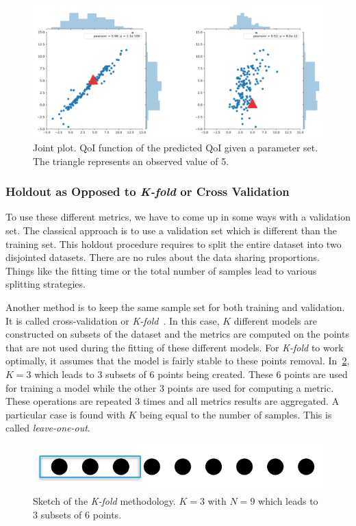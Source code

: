 \begin{figure}[!ht]
\centering
\includegraphics[width=\linewidth,keepaspectratio]{fig/literature/qq_plot.png}
\caption{Joint plot. QoI function of the predicted QoI given a parameter set. The triangle represents an observed value of 5.}
\label{fig:qq_plot}
\end{figure}

\subsubsection{Holdout as Opposed to \emph{K-fold} or Cross Validation}
To use these different metrics, we have to come up in some ways with a validation set. The classical approach is to use a validation set which is different than the training set. This holdout procedure requires to split the entire dataset into two disjointed datasets. There are no rules about the data sharing proportions. Things like the fitting time or the total number of samples lead to various splitting strategies.

Another method is to keep the same sample set for both training and validation. It is called cross-validation or \emph{K-fold}~\cite{kohavi1995}. In this case, $K$ different models are constructed on subsets of the dataset and the metrics are computed on the points that are not used during the fitting of these different models. For \emph{K-fold} to work optimally, it assumes that the model is fairly stable to these points removal. In~\cref{fig:k_fold}, $K=3$ which leads to 3 subsets of 6 points being created. These 6 points are used for training a model while the other 3 points are used for computing a metric. These operations are repeated 3 times and all metrics results are aggregated. A particular case is found with $K$ being equal to the number of samples. This is called \emph{leave-one-out}.

\begin{figure}[!ht]
\centering
\includegraphics[width=0.6\linewidth,keepaspectratio]{fig/literature/k_fold.png}
\caption{Sketch of the \emph{K-fold} methodology. $K=3$ with $N=9$ which leads to 3 subsets of 6 points.}
\label{fig:k_fold}
\end{figure}


